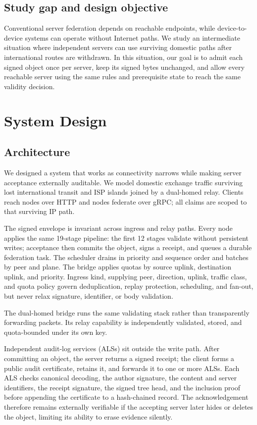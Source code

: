 \documentclass[conference,a4paper,10pt]{IEEEtran}
\begin{document}
\subsection{Study gap and design objective}

Conventional server federation depends on reachable endpoints, while device-to-device systems can operate without Internet paths. We study an intermediate situation where independent servers can use surviving domestic paths after international routes are withdrawn. In this situation, our goal is to admit each signed object once per server, keep its signed bytes unchanged, and allow every reachable server using the same rules and prerequisite state to reach the same validity decision.

\section{System Design}
\label{sec:design}

\subsection{Architecture}

We designed a system that works as connectivity narrows while making server acceptance externally auditable. We model domestic exchange traffic surviving lost international transit and ISP islands joined by a dual-homed relay. Clients reach nodes over HTTP and nodes federate over gRPC; all claims are scoped to that surviving IP path.

The signed envelope is invariant across ingress and relay paths. Every node applies the same 19-stage pipeline: the first 12 stages validate without persistent writes; acceptance then commits the object, signs a receipt, and queues a durable federation task. The scheduler drains in priority and sequence order and batches by peer and plane. The bridge applies quotas by source uplink, destination uplink, and priority. Ingress kind, supplying peer, direction, uplink, traffic class, and quota policy govern deduplication, replay protection, scheduling, and fan-out, but never relax signature, identifier, or body validation.

The dual-homed bridge runs the same validating stack rather than transparently forwarding packets. Its relay capability is independently validated, stored, and quota-bounded under its own key.

Independent audit-log services (ALSs) sit outside the write path. After committing an object, the server returns a signed receipt; the client forms a public audit certificate, retains it, and forwards it to one or more ALSs. Each ALS checks canonical decoding, the author signature, the content and server identifiers, the receipt signature, the signed tree head, and the inclusion proof before appending the certificate to a hash-chained record. The acknowledgement therefore remains externally verifiable if the accepting server later hides or deletes the object, limiting its ability to erase evidence silently.
\end{document}
